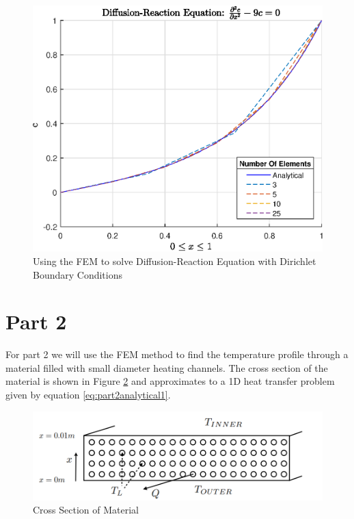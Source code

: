 \documentclass[11pt]{article}
\begin{document}
\begin{figure}[h!] \label{fig:DiffReact1}
    \centering
    \includegraphics{epsReactDiff1}
    \caption{Using the FEM to solve Diffusion-Reaction Equation with Dirichlet Boundary Conditions}
\end{figure}


\section{Part 2}

For part 2 we will use the FEM method to find the temperature profile through a material filled with small diameter heating channels. The cross section of the material is shown in Figure \ref{fig:CrossSection} and approximates to a 1D heat transfer problem given by equation \ref{eq:part2analytical1}.

\begin{figure}[h!] \label{fig:CrossSection}
    \centering
    \includegraphics{CrossSection}
    \caption{Cross Section of Material }
\end{figure}
\end{document}
